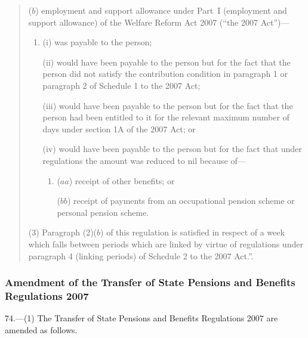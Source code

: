 \documentclass[12pt,a4paper]{article}
\begin{document}
\begin{quotation}
\begin{enumerate}
($b$) employment and support allowance under Part~I (employment and support allowance) of the Welfare Reform Act 2007 (“the 2007 Act”)—
\begin{enumerate}\item[]
(i) was payable to the person;

(ii) would have been payable to the person but for the fact that the person did not satisfy the contribution condition in paragraph 1 or paragraph 2 of Schedule 1 to the 2007 Act;

(iii) would have been payable to the person but for the fact that the person had been entitled to it for the relevant maximum number of days under section 1A of the 2007 Act; or

(iv) would have been payable to the person but for the fact that under regulations the amount was reduced to nil because of—
\begin{enumerate}\item[]
($aa$) receipt of other benefits; or

($bb$) receipt of payments from an occupational pension scheme or personal pension scheme.
\end{enumerate}
\end{enumerate}
\end{enumerate}

(3) Paragraph (2)($b$)  of this regulation is satisfied in respect of a week which falls between periods which are linked by virtue of regulations under paragraph 4 (linking periods) of Schedule 2 to the 2007 Act.”.
\end{quotation}

\subsubsection[74. Amendment of the Transfer of State Pensions and Benefits Regulations 2007]{Amendment of the Transfer of State Pensions and Benefits Regulations 2007}

74.—(1) The Transfer of State Pensions and Benefits Regulations 2007 are amended as follows.
\end{document}
